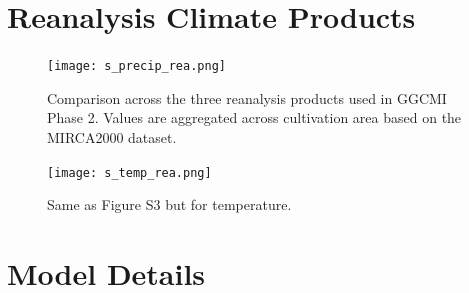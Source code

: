 \documentclass[10pt]{article}
\begin{document}
\clearpage
\section{Reanalysis Climate Products}
\begin{figure}[h!]
    \centering
    \texttt{[image: s\_precip\_rea.png]}
    \caption{Comparison across the three reanalysis products used in GGCMI Phase 2. Values are aggregated across cultivation area based on the MIRCA2000 dataset.}
    \label{fig:precip_rea}
\end{figure}

\begin{figure}[h!]
    \centering
    \texttt{[image: s\_temp\_rea.png]}
    \caption{Same as Figure S3 but for temperature.}
    \label{fig:precip_rea}
\end{figure}

\clearpage
\section{Model Details}
\end{document}
